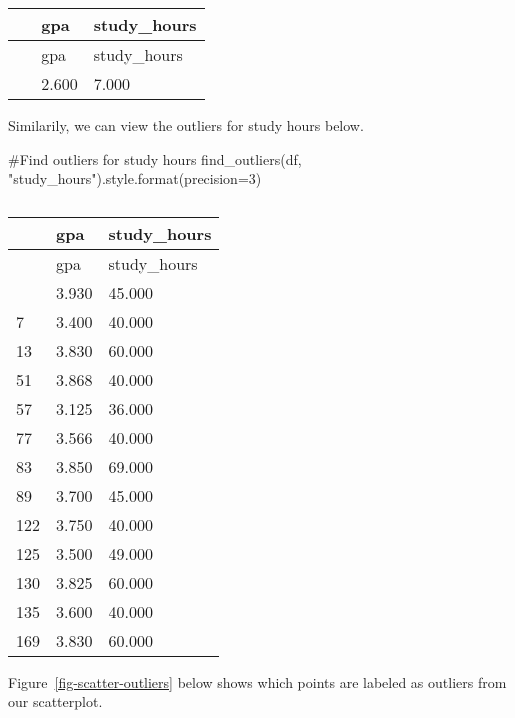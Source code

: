 \documentclass[
  letterpaper,
  DIV=11,
  numbers=noendperiod]{scrreprt}
\newenvironment{Shaded}{\begin{snugshade}}{\end{snugshade}}
\newcommand{\BuiltInTok}[1]{\textcolor[rgb]{0.00,0.23,0.31}{#1}}
\newcommand{\CommentTok}[1]{\textcolor[rgb]{0.37,0.37,0.37}{#1}}
\newcommand{\DecValTok}[1]{\textcolor[rgb]{0.68,0.00,0.00}{#1}}
\newcommand{\NormalTok}[1]{\textcolor[rgb]{0.00,0.23,0.31}{#1}}
\newcommand{\OperatorTok}[1]{\textcolor[rgb]{0.37,0.37,0.37}{#1}}
\newcommand{\StringTok}[1]{\textcolor[rgb]{0.13,0.47,0.30}{#1}}
\begin{document}
\begin{longtable}[]{@{}lll@{}}
\caption{}\label{T_2e3cc}\tabularnewline
\toprule\noalign{}
~ & gpa & study\_hours \\
\midrule\noalign{}
\endfirsthead
\toprule\noalign{}
~ & gpa & study\_hours \\
\midrule\noalign{}
\endhead
\bottomrule\noalign{}
\endlastfoot
108 & 2.600 & 7.000 \\
\end{longtable}

Similarily, we can view the outliers for study hours below.

\begin{Shaded}
\begin{Highlighting}[]
\CommentTok{\#Find outliers for study hours}
\NormalTok{find\_outliers(df, }\StringTok{"study\_hours"}\NormalTok{).style.}\BuiltInTok{format}\NormalTok{(precision}\OperatorTok{=}\DecValTok{3}\NormalTok{)}
\end{Highlighting}
\end{Shaded}

\begin{longtable}[]{@{}lll@{}}
\caption{}\label{T_7c3b2}\tabularnewline
\toprule\noalign{}
~ & gpa & study\_hours \\
\midrule\noalign{}
\endfirsthead
\toprule\noalign{}
~ & gpa & study\_hours \\
\midrule\noalign{}
\endhead
\bottomrule\noalign{}
\endlastfoot
2 & 3.930 & 45.000 \\
7 & 3.400 & 40.000 \\
13 & 3.830 & 60.000 \\
51 & 3.868 & 40.000 \\
57 & 3.125 & 36.000 \\
77 & 3.566 & 40.000 \\
83 & 3.850 & 69.000 \\
89 & 3.700 & 45.000 \\
122 & 3.750 & 40.000 \\
125 & 3.500 & 49.000 \\
130 & 3.825 & 60.000 \\
135 & 3.600 & 40.000 \\
169 & 3.830 & 60.000 \\
\end{longtable}

Figure~\ref{fig-scatter-outliers} below shows which points are labeled
as outliers from our scatterplot.
\end{document}
